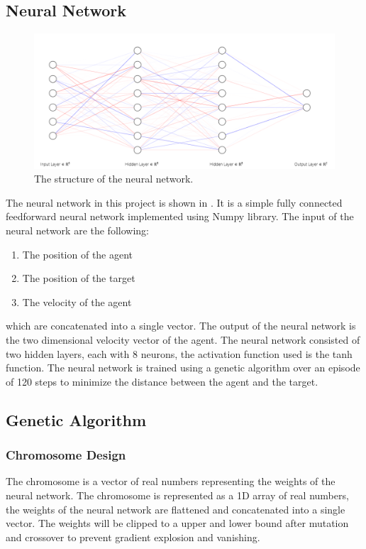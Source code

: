 \documentclass[sigconf]{acmart}
\begin{document}
\subsection{Neural Network}
\begin{figure}[H]
  \centering
  \includegraphics[width=0.95\linewidth]{imgs/NeuralNetwork.png}
  \caption{The structure of the neural network.}
  \label{fig:neural_network}
\end{figure}
The neural network in this project is shown in . It is a simple fully connected feedforward neural network implemented using Numpy library. The input of the neural network are the following:
\begin{enumerate}
  \item The position of the agent
  \item The position of the target
  \item The velocity of the agent
\end{enumerate}
which are concatenated into a single vector.
The output of the neural network is the two dimensional velocity vector of the agent. The neural network consisted of two hidden layers, each with 8 neurons, the activation function used is the tanh function. The neural network is trained using a genetic algorithm over an episode of 120 steps to minimize the distance between the agent and the target.

\subsection{Genetic Algorithm}
\subsubsection{Chromosome Design} The chromosome is a vector of real numbers representing the weights of the neural network. The chromosome is represented as a 1D array of real numbers, the weights of the neural network are flattened and concatenated into a single vector. The weights will be clipped to a upper and lower bound after mutation and crossover to prevent gradient explosion and vanishing.
\end{document}
